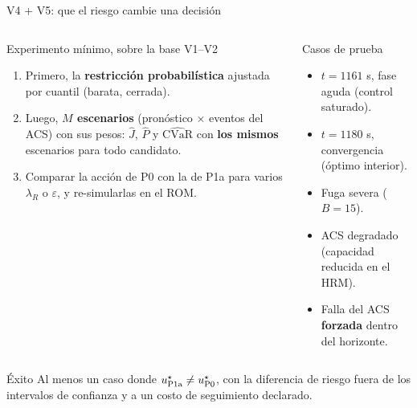 \documentclass[aspectratio=169,10pt]{beamer}
\newcommand{\key}[1]{{\color{USMBlue}\bfseries #1}}
\begin{document}
\begin{frame}{V4 + V5: que el riesgo cambie una decisión}
\begin{columns}[T]
\begin{block}{Experimento mínimo, sobre la base V1--V2}
\small
\begin{enumerate}\setlength{\itemsep}{.05cm}
\item Primero, la \key{restricción probabilística} ajustada por cuantil (barata, cerrada).
\item Luego, \key{$M$ escenarios} (pronóstico $\times$ eventos del ACS) con sus pesos: $\hat J$, $\hat P$ y $\widehat{\mathrm{CVaR}}$ con \key{los mismos} escenarios para todo candidato.
\item Comparar la acción de P0 con la de P1a para varios $\lambda_R$ o $\varepsilon$, y re-simularlas en el ROM.
\end{enumerate}
\end{block}
\begin{block}{Casos de prueba}
\begin{itemize}\setlength{\itemsep}{.08cm}
\item $t=1161$ s, fase aguda (control saturado).
\item $t=1180$ s, convergencia (óptimo interior).
\item Fuga severa ($B=15$).
\item ACS degradado (capacidad reducida en el HRM).
\item Falla del ACS \key{forzada} dentro del horizonte.
\end{itemize}
\end{block}
\end{columns}
\vspace{.02cm}
\begin{exampleblock}{Éxito}
Al menos un caso donde $u^\star_{\rm P1a}\neq u^\star_{\rm P0}$, con la diferencia de riesgo fuera de los intervalos de confianza y a un costo de seguimiento declarado.
\end{exampleblock}
\end{frame}
\end{document}
